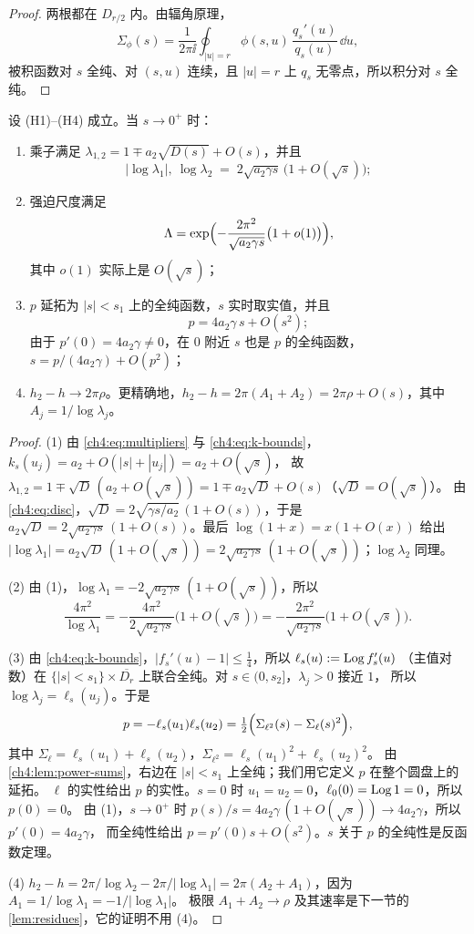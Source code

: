 \begin{proof}
两根都在 $D_{r/2}$ 内。由辐角原理，
\[
 \Sigma_\phi(s)=\frac1{2\pi\ii}\oint_{|u|=r}\phi(s,u)\,\frac{q_s'(u)}{q_s(u)}\,\dd u ,
\]
被积函数对 $s$ 全纯、对 $(s,u)$ 连续，且 $|u|=r$ 上 $q_s$ 无零点，所以积分对 $s$ 全纯。
\end{proof}

\begin{proposition}[尺度]\label{prop:scales}
设 (H1)--(H4) 成立。当 $s\to0^+$ 时：
\begin{enumerate}
\item 乘子满足 $\lambda_{1,2}=1\mp a_2\sqrt{D(s)}+O(s)$，并且
  \[
   |\log\lambda_1|,\ \log\lambda_2\;=\;2\sqrt{a_2\gamma s}\,\bigl(1+O(\sqrt s)\bigr);
  \]
\item 强迫尺度满足
  \[
   \Lambda=\exp\Bigl(-\frac{2\pi^2}{\sqrt{a_2\gamma s}}\bigl(1+o(1)\bigr)\Bigr),
  \]
  其中 $o(1)$ 实际上是 $O(\sqrt s)$；
\item $p$ 延拓为 $|s|<s_1$ 上的全纯函数，$s$ 实时取实值，并且
  \[
   p=4a_2\gamma\,s+O(s^2);
  \]
  由于 $p'(0)=4a_2\gamma\ne0$，在 $0$ 附近 $s$ 也是 $p$ 的全纯函数，$s=p/(4a_2\gamma)+O(p^2)$；
\item $h_2-h\to2\pi\rho$。更精确地，$h_2-h=2\pi(A_1+A_2)=2\pi\rho+O(s)$，其中 $A_j=1/\log\lambda_j$。
\end{enumerate}
\end{proposition}

\begin{proof}
(1) 由 \eqref{ch4:eq:multipliers} 与 \eqref{ch4:eq:k-bounds}，$k_s(u_j)=a_2+O(|s|+|u_j|)=a_2+O(\sqrt s)$，
故 $\lambda_{1,2}=1\mp\sqrt D\,(a_2+O(\sqrt s))=1\mp a_2\sqrt D+O(s)$（$\sqrt D=O(\sqrt s)$）。
由 \eqref{ch4:eq:disc}，$\sqrt{D}=2\sqrt{\gamma s/a_2}\,(1+O(s))$，于是
$a_2\sqrt D=2\sqrt{a_2\gamma s}\,(1+O(s))$。最后 $\log(1+x)=x(1+O(x))$ 给出
$|\log\lambda_1|=a_2\sqrt D\,(1+O(\sqrt s))=2\sqrt{a_2\gamma s}\,(1+O(\sqrt s))$；$\log\lambda_2$ 同理。

(2) 由 (1)，$\log\lambda_1=-2\sqrt{a_2\gamma s}\,(1+O(\sqrt s))$，所以
\[
 \frac{4\pi^2}{\log\lambda_1}=-\frac{4\pi^2}{2\sqrt{a_2\gamma s}}\bigl(1+O(\sqrt s)\bigr)
 =-\frac{2\pi^2}{\sqrt{a_2\gamma s}}\bigl(1+O(\sqrt s)\bigr).
\]

(3) 由 \eqref{ch4:eq:k-bounds}，$|f_s'(u)-1|\le\frac14$，所以 $\ell_s(u):=\operatorname{Log} f_s'(u)$
（主值对数）在 $\{|s|<s_1\}\times\overline{D_r}$ 上联合全纯。对 $s\in(0,s_2]$，$\lambda_j>0$ 接近 $1$，
所以 $\log\lambda_j=\ell_s(u_j)$。于是
\[
 p=-\ell_s(u_1)\ell_s(u_2)=\tfrac12\Bigl(\Sigma_{\ell^2}(s)-\Sigma_\ell(s)^2\Bigr),
\]
其中 $\Sigma_\ell=\ell_s(u_1)+\ell_s(u_2)$，$\Sigma_{\ell^2}=\ell_s(u_1)^2+\ell_s(u_2)^2$。
由 \cref{ch4:lem:power-sums}，右边在 $|s|<s_1$ 上全纯；我们用它定义 $p$ 在整个圆盘上的延拓。
$\ell$ 的实性给出 $p$ 的实性。$s=0$ 时 $u_1=u_2=0$，$\ell_0(0)=\operatorname{Log}1=0$，所以 $p(0)=0$。
由 (1)，$s\to0^+$ 时 $p(s)/s=4a_2\gamma\,(1+O(\sqrt s))\to4a_2\gamma$，所以 $p'(0)=4a_2\gamma$，
而全纯性给出 $p=p'(0)s+O(s^2)$。$s$ 关于 $p$ 的全纯性是反函数定理。

(4) $h_2-h=2\pi/\log\lambda_2-2\pi/|\log\lambda_1|=2\pi(A_2+A_1)$，因为 $A_1=1/\log\lambda_1=-1/|\log\lambda_1|$。
极限 $A_1+A_2\to\rho$ 及其速率是下一节的 \cref{lem:residues}，它的证明不用 (4)。
\end{proof}

